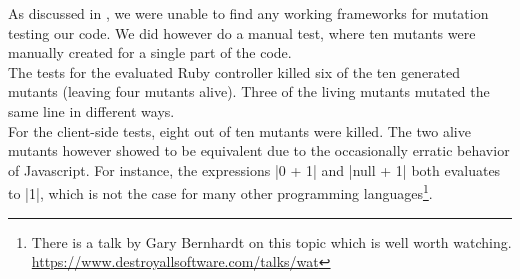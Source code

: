 \MakeShortVerb{\|}

As discussed in , we were unable to find any working
frameworks for mutation testing our code. We did however do a manual
test, where ten mutants were manually created for a single part of the
code.\\

The tests for the evaluated Ruby controller killed six of the ten
generated mutants (leaving four mutants alive). Three of the living
mutants mutated the same line in different ways.\\

For the client-side tests, eight out of ten mutants were killed. The two
alive mutants however showed to be equivalent due to the occasionally
erratic behavior of Javascript. For instance, the expressions |0 + 1|
and |null + 1| both evaluates to |1|, which is not the case for many
other programming languages\footnote{There is a talk by Gary
Bernhardt on this topic which is well worth watching.
\url{https://www.destroyallsoftware.com/talks/wat}}.\\
